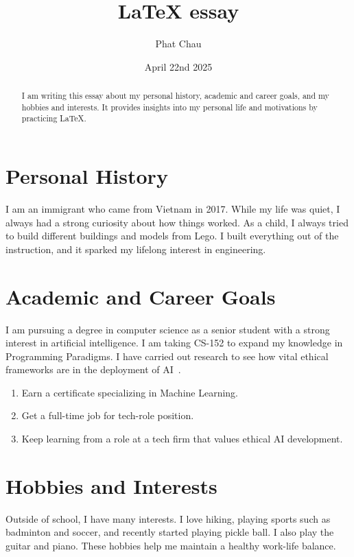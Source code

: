 \documentclass{article}
\title{LaTeX essay}
\author{Phat Chau}
\date{April 22nd 2025}
\begin{document}
\maketitle
\begin{abstract}
I am writing this essay about my personal history, academic and career goals, and my hobbies and interests. It provides insights into my personal life and motivations by practicing LaTeX.
\end{abstract}
    
    \section{Personal History}
    I am an immigrant who came from Vietnam in 2017. While my life was quiet, I always had a strong curiosity about how things worked. As a child, I always tried to build different buildings and models from Lego. I built everything out of the instruction, and it sparked my lifelong interest in engineering.
    
    \section{Academic and Career Goals}
    I am pursuing a degree in computer science as a senior student with a strong interest in artificial intelligence. I am taking CS-152 to expand my knowledge in Programming Paradigms. I have carried out research to see how vital ethical frameworks are in the deployment of AI~\cite{DBLP:journals/access/NetturKNG25}.
    
    \begin{enumerate}[label=\arabic*.]
      \item Earn a certificate specializing in Machine Learning.
      \item Get a full-time job for tech-role position.
      \item Keep learning from a role at a tech firm that values ethical AI development.
    \end{enumerate}
    
    
    \section{Hobbies and Interests}
    Outside of school, I have many interests. I love hiking, playing sports such as badminton and soccer, and recently started playing pickle ball. I also play the guitar and piano. These hobbies help me maintain a healthy work-life balance.
\end{document}
